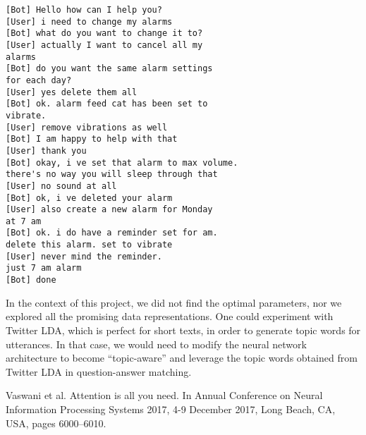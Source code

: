 \documentclass[10pt, twocolumn, a4paper]{article}
\begin{document}
\begin{verbatim}
[Bot] Hello how can I help you?
[User] i need to change my alarms
[Bot] what do you want to change it to?
[User] actually I want to cancel all my 
alarms
[Bot] do you want the same alarm settings 
for each day?
[User] yes delete them all
[Bot] ok. alarm feed cat has been set to
vibrate.
[User] remove vibrations as well
[Bot] I am happy to help with that
[User] thank you
[Bot] okay, i ve set that alarm to max volume.
there's no way you will sleep through that
[User] no sound at all
[Bot] ok, i ve deleted your alarm
[User] also create a new alarm for Monday 
at 7 am
[Bot] ok. i do have a reminder set for am. 
delete this alarm. set to vibrate
[User] never mind the reminder. 
just 7 am alarm
[Bot] done
\end{verbatim}


In the context of this project, we did not find the optimal parameters, nor we explored all the promising data representations. One could experiment with Twitter LDA, which is perfect for short texts, in order to generate topic words for utterances. In that case, we would need to modify the neural network architecture to become “topic-aware” and leverage the topic words obtained from Twitter LDA in question-answer matching. 
 

\begin{thebibliography}{5}  

 Vaswani et al. Attention is all you need. In Annual Conference on Neural Information Processing Systems 2017, 4-9 December 2017, Long Beach, CA, USA, pages 6000–6010.

\end{thebibliography}
 
\end{document}
